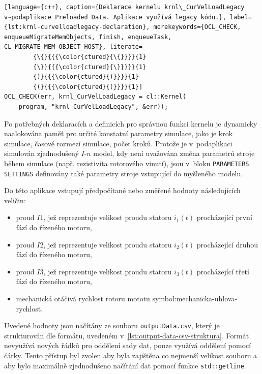 \documentclass[a4paper, twoside, 11pt]{article}
\begin{document}
	   \begin{lstlisting}[language={c++}, caption={Deklarace kernelu krnl\_CurVelLoadLegacy v~podaplikace Preloaded Data. Aplikace využívá legacy kódu.}, label={lst:krnl-curvelloadlegacy-declaration}, morekeywords={OCL_CHECK, enqueueMigrateMemObjects, finish, enqueueTask, CL_MIGRATE_MEM_OBJECT_HOST}, literate=
		{\{}{{{\color{ctured}{\{}}}}{1}
		{\}}{{{\color{ctured}{\}}}}}{1}
		{)}{{{\color{ctured}{)}}}}{1}
		{(}{{{\color{ctured}{(}}}}{1}]
OCL_CHECK(err, krnl_CurVelLoadLegacy = cl::Kernel(
	program, "krnl_CurVelLoadLegacy", &err));
\end{lstlisting}
	Po potřebných deklaracích a definicích pro správnou funkci kernelu je dynamicky naalokována paměť pro určité konstatní parametry simulace, jako je krok simulace, časové rozmezí simulace, počet kroků. Protože je v~podaplikaci simulován zjednodušený $I$-$n$ model, kdy není uvažována změna parametrů stroje během simulace (např. rezistivita rotorového vinutí), jsou v~bloku \texttt{PARAMETERS SETTINGS} definovány také parametry stroje vstupující do myšleného modelu.\par
	Do této aplikace vstupují předpočítané nebo změřené hodnoty následujících veličin:
	\begin{itemize}
		\item proud $I1$, jež reprezentuje velikost proudu statoru $i_1 (t)$ procházející první fází do řízeného motoru,
		\item proud $I2$, jež reprezentuje velikost proudu statoru $i_2 (t)$ procházející druhou fází do řízeného motoru,
		\item proud $I3$, jež reprezentuje velikost proudu statoru $i_3 (t)$ procházející třetí fází do řízeného motoru,
		\item mechanická otáčivá rychlost rotoru mototu \gls{symbol:mechanicka-uhlova-rychlost}.
	\end{itemize}
	Uvedené hodnoty jsou načítány ze souboru \texttt{outputData.csv}, který je strukturován dle formátu, uvedeném v~\ref{lst:output-data-csv-struktura}. Formát nevyužívá nových řádků pro oddělení sady dat, pouze využívá oddělení pomocí čárky. Tento přístup byl zvolen aby byla zajištěna co nejmenší velikost souboru a aby bylo maximálně zjednodušeno načítání dat pomocí funkce \texttt{std::getline}.\par
\end{document}
